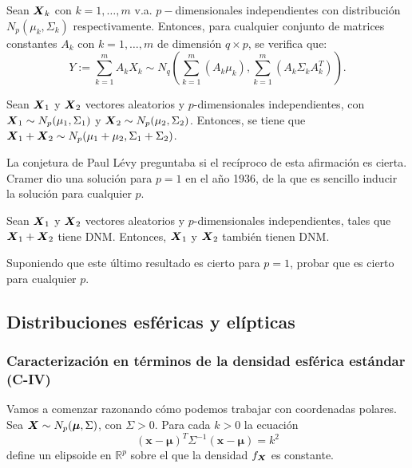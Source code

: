 \begin{nprop}
  Sean $\boldsymbol{X}_k$ con $k = 1,\dots,m$ v.a. $p-$dimensionales independientes con distribución $N_p\left(\mu_k, \Sigma_k\right)$ respectivamente. Entonces, para cualquier conjunto de matrices constantes $A_k$ con $k = 1,\dots, m$ de dimensión $q\times p$, se verifica que:
  \[
Y:= \sum_{k=1}^{m} A_k X_k \sim N_q\left(\sum_{k=1}^m\left(A_k \mu_k\right), \sum_{k=1}^m\left(A_k \Sigma_k A_k^T\right)\right)
  .\]
\end{nprop}

\begin{nth}[Cramer]
  Sean $\boldsymbol{X}_1$ y $\boldsymbol{X}_2$ vectores aleatorios y $p$-dimensionales independientes, con $\boldsymbol{X}_1 \sim N_p(\mu_1, \Sigma_1)$ y $\boldsymbol{X}_2 \sim N_p(\mu_2, \Sigma_2)$. Entonces, se tiene que $\boldsymbol{X}_1 + \boldsymbol{X}_2 \sim N_p(\mu_1 + \mu_2, \Sigma_1 + \Sigma_2)$.
\end{nth}

La conjetura de Paul Lévy preguntaba si el recíproco de esta afirmación es cierta. Cramer dio una solución para $p=1$ en el año 1936, de la que es sencillo inducir la solución para cualquier $p$. 

\begin{nth}
  Sean $\boldsymbol{X}_1$ y $\boldsymbol{X}_2$ vectores aleatorios y $p$-dimensionales independientes, tales que $\boldsymbol{X}_1 + \boldsymbol{X}_2$ tiene DNM. Entonces, $\boldsymbol{X}_1$ y $\boldsymbol{X}_2$ también tienen DNM.
\end{nth}

\begin{ejer}
  Suponiendo que este último resultado es cierto para $p=1$, probar que es cierto para cualquier $p$.
\end{ejer}

\subsection{Distribuciones esféricas y elípticas}

\subsubsection{Caracterización en términos de la densidad esférica estándar (C-IV)}

Vamos a comenzar razonando cómo podemos trabajar con coordenadas polares. Sea $\boldsymbol{X} \sim N_p(\boldsymbol \mu, \Sigma)$, con $\Sigma > 0$. Para cada $k > 0$ la ecuación \[(\boldsymbol x - \boldsymbol \mu)^T \Sigma^{-1}(\boldsymbol x - \boldsymbol \mu) = k^2\] define un elipsoide en $\mathbb R^p$ sobre el que la densidad $f_{\boldsymbol{X}}$ es constante. 

